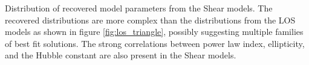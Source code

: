 \label{fig:shear_triangle} Distribution of recovered model parameters from the Shear models. The recovered distributions are more complex than the distributions from the LOS models as shown in figure \ref{fig:los_triangle}, possibly suggesting multiple families of best fit solutions. The strong correlations between power law index, ellipticity, and the Hubble constant are also present in the Shear models.